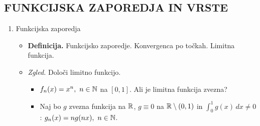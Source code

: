 \subsection{FUNKCIJSKA ZAPOREDJA IN VRSTE}
\begin{enumerate}
    \item Funkcijska zaporedja
    \begin{itemize}
        \item \colorbox{purple!30}{\textbf{Definicija.}} Funkcijsko zaporedje. Konvergenca po točkah. Limitna funkcija.
        \item \colorbox{yellow!30}{\emph{Zgled.}} Določi limitno funkcijo. 
        \begin{itemize}
            \item $f_n(x) = x^n, \ n \in \mathbb{N}$ na $[0,1]$. Ali je limitna funkcija zvezna?
            \item Naj bo $g$ zvezna funkcija na $\mathbb{R}$, $g \equiv 0$ na $\mathbb{R} \setminus (0,1)$ in $\displaystyle \int_{0}^{1} g(x) \,dx  \neq 0$: $g_n(x) = ng(nx), \ n \in \mathbb{N}$. 
            

\end{itemize}
\end{itemize}
\end{enumerate}
